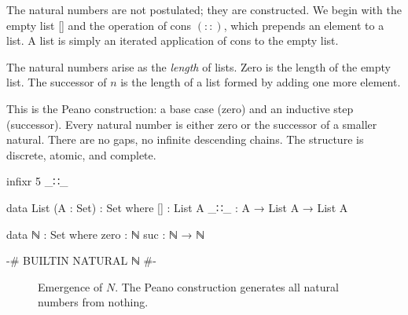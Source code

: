\documentclass[11pt,a4paper]{book}
\def\mathbb#1{#1}%
\def\texttt#1{#1}%
\begin{document}
The natural numbers are not postulated; they are constructed. We begin with the empty 
list \texttt{[]} and the operation of cons $(\texttt{::})$, which prepends an element 
to a list. A list is simply an iterated application of cons to the empty list.

The natural numbers arise as the \emph{length} of lists. Zero is the length of the 
empty list. The successor of $n$ is the length of a list formed by adding one more 
element.

This is the Peano construction: a base case (zero) and an inductive step (successor). 
Every natural number is either zero or the successor of a smaller natural. There are 
no gaps, no infinite descending chains. The structure is discrete, atomic, and complete.

\begin{code}
infixr 5 _∷_


data List (A : Set) : Set where
  []  : List A
  _∷_ : A → List A → List A

data ℕ : Set where
  zero : ℕ
  suc  : ℕ → ℕ

{-# BUILTIN NATURAL ℕ #-}
\end{code}

\begin{figure}[h]
\centering
{}
\caption{Emergence of $\mathbb{N}$. The Peano construction generates all natural numbers from nothing.}
\label{fig:peano-emergence}
\end{figure}
\end{document}
